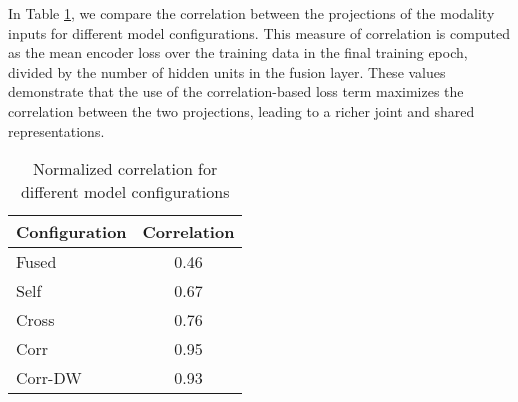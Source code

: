 \documentclass[10pt,twocolumn,letterpaper]{article}
\begin{document}
In Table \ref{tab:corr}, we compare the correlation between the projections of the modality inputs for different model configurations. This measure of correlation is computed as the mean encoder loss over the training data in the final training epoch, divided by the number of hidden units in the fusion layer. These values demonstrate that the use of the correlation-based loss term maximizes the correlation between the two projections, leading to a richer joint and shared representations. 
\begin{table}
\begin{center}
\begin{tabular}{|l|c|}
	\hline
    Configuration & Correlation \\ 
    \hline
    Fused & 0.46 \\
    Self &  0.67\\
    Cross &  0.76\\
    \hline
    Corr &  0.95\\
    Corr-DW & 0.93 \\
    \hline
\end{tabular}
\end{center}
\caption{Normalized correlation for different model configurations}
\label{tab:corr}
\end{table}






\end{document}
